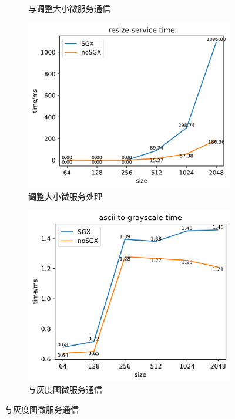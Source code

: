 \begin{figure}[!ht]
\begin{subfigure}{0.3\textwidth}
        \caption{与调整大小微服务通信}
    \end{subfigure}
    \begin{subfigure}{0.32\textwidth}
        \centering
        \includegraphics[width=\textwidth]{figures/resize_service.pdf}
        \caption{调整大小微服务处理}
    \end{subfigure}
    \begin{subfigure}{0.32\textwidth}
        \centering
        \includegraphics[width=\textwidth]{figures/ascii_to_grayscale.pdf}
        \caption{与灰度图微服务通信}

\end{subfigure}
\end{figure}
